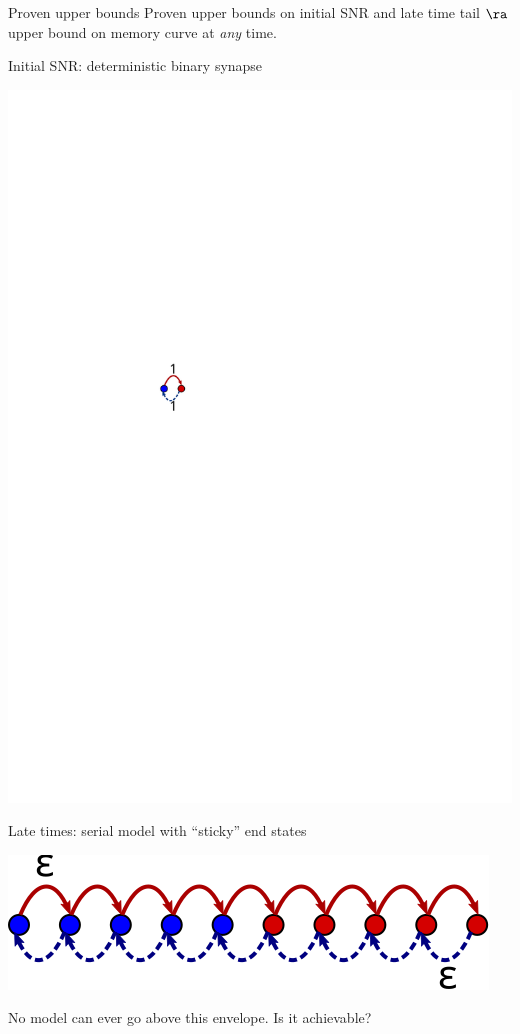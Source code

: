 \documentclass[final,hyperref={pdfpagelabels=false,bookmarks=false}]{beamer}
\begin{document}
\begin{frame}{}
\begin{columns}[t]
\begin{column}{0.33\linewidth}

\begin{block}{Proven upper bounds}
%
 Proven upper bounds on initial SNR and late time tail
 $\ra$ upper bound on memory curve at \emph{any} time.

\vp
\parbox[c]{0.45\linewidth}{
 \begin{center}
 \end{center}
}
\hspace{0.5cm}
\parbox[c]{0.45\linewidth}{
   Initial SNR: deterministic binary synapse
   \begin{center}
     \includegraphics[height=0.1\linewidth]{binary_det.svg}
   \end{center}

   \vp Late times: serial model with ``sticky'' end states
   \begin{center}
     \includegraphics[height=0.1\linewidth]{multistate_sticky.svg}
   \end{center}
}


 \vp No model can ever go above this envelope.
 Is it achievable?
%
\end{block}



\end{column}
\end{columns}
\end{frame}
\end{document}
